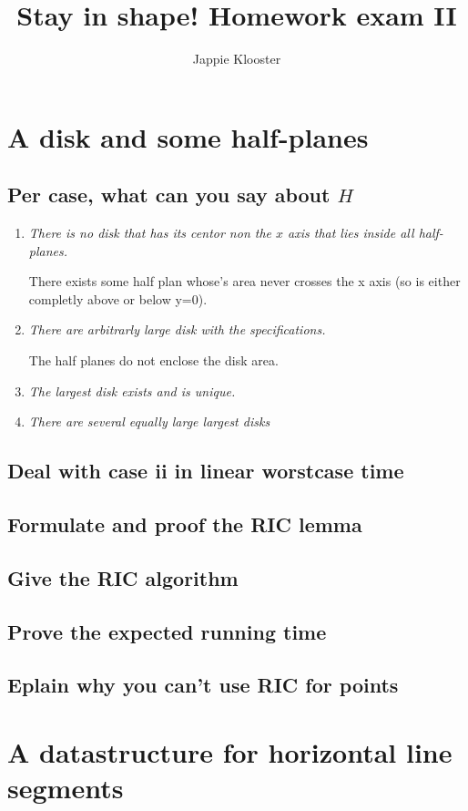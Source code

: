 \documentclass{article}
\begin{document}
\author{Jappie Klooster}
\title{Stay in shape! Homework exam II}
\maketitle
\section{A disk and some half-planes}
\subsection{Per case, what can you say about $H$}
\begin{enumerate}[i]
	\item \emph{There is no disk that has its centor non the $x$ axis
			that lies inside all half-planes.}

		There exists some half plan whose's area never crosses the x axis
		(so is either completly above or below y=0).
	\item \emph{There are arbitrarly large disk with the specifications.}

		The half planes do not enclose the disk area.
	\item \emph{The largest disk exists and is unique.}


	\item \emph{There are several equally large largest disks}
\end{enumerate}
\subsection{Deal with case ii in linear worstcase time}
\subsection{Formulate and proof the RIC lemma}
\subsection{Give the RIC algorithm}
\subsection{Prove the expected running time}
\subsection{Eplain why you can't use RIC for points}
\section{A datastructure for horizontal line segments}
\end{document}
